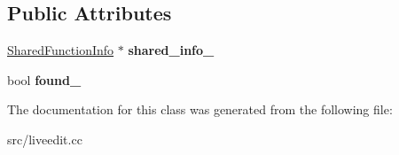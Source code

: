 \subsection*{Public Attributes}
\begin{DoxyCompactItemize}
\item 
\hypertarget{classv8_1_1internal_1_1_dependent_function_marker_a1aaf31b42c378b1b17e0c855f8ea4dd8}{}\hyperlink{classv8_1_1internal_1_1_shared_function_info}{Shared\+Function\+Info} $\ast$ {\bfseries shared\+\_\+info\+\_\+}\label{classv8_1_1internal_1_1_dependent_function_marker_a1aaf31b42c378b1b17e0c855f8ea4dd8}

\item 
\hypertarget{classv8_1_1internal_1_1_dependent_function_marker_a9ace0cfb707a5e92d407e09fc9611581}{}bool {\bfseries found\+\_\+}\label{classv8_1_1internal_1_1_dependent_function_marker_a9ace0cfb707a5e92d407e09fc9611581}

\end{DoxyCompactItemize}


The documentation for this class was generated from the following file\+:\begin{DoxyCompactItemize}
\item 
src/liveedit.\+cc\end{DoxyCompactItemize}
